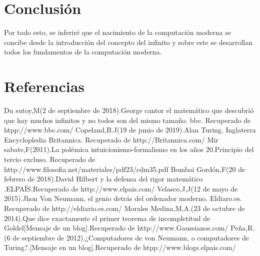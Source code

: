 \documentclass[12pt]{article}
\begin{document}
\section{Conclusión}
       Por todo esto, se inferiré que el nacimiento de la computación moderna se concibe desde la introducción del concepto del infinito y sobre este se desarrollan todos los fundamentos de la computación moderna.
       \section{Referencias}
         \begin{thebibliography}{10}
         \bibitem{}	Du sutoy,M(2 de septiembre de 2018).George cantor el matemático que descubrió que hay muchos infinitos y no todos son del mismo tamaño. bbc. Recuperado de htpp://www.bbc.com/
        \bibitem{}Copeland,B.J(19 de junio de 2019).Alan Turing. Inglaterra Encyclopledia Britannica. Recuperado de http://Britannica.com/
        \bibitem{}Mir sabate,F(2011).La polémica intuicionismo-formalismo en los años 20.Principio del tercio excluso. Recuperado de http://www.filosofia.net/materiales/pdf23/cdm35.pdf
        \bibitem{}Bombai Gordón,F(20 de febrero de 2018).David Hilbert y la defensa del rigor matemático .ELPAÍS.Recuperado de http://www.elpais.com/
        \bibitem{}Velasco,J,J(12 de mayo de 2015).Jhon Von Neumann, el genio detrás del ordenador moderno. Eldiaro.es. Recuperado de http://eldiario.es.com/ 
        \bibitem{}Morales Medina,M,A.(23 de octubre de 2014).Que dice exactamente el primer teorema de incompletitud de Goldel[Mensaje de un blog].Recuperado de http://www.Gaussianos.com/
        \bibitem{}Peña,R.(6 de septiembre de 2012).¿Computadores de von Neumann, o computadores de Turing?.[Mensaje en un blog].Recuperado de htpp://www.blogs.elpais.com/
         \end{thebibliography}
\end{document}

